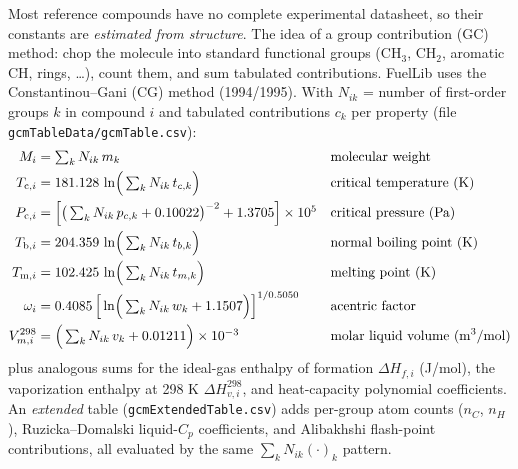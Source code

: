 \documentclass[11pt]{article}
\begin{document}
Most reference compounds have no complete experimental datasheet, so their
constants are \emph{estimated from structure}. The idea of a group
contribution (GC) method: chop the molecule into standard functional groups
($\mathrm{CH_3}$, $\mathrm{CH_2}$, aromatic CH, rings, \ldots), count them, and sum
tabulated contributions. FuelLib uses the Constantinou--Gani (CG) method
(1994/1995). With $N_{ik}$ = number of first-order groups $k$ in compound
$i$ and tabulated contributions $c_k$ per property (file
\texttt{gcmTableData/gcmTable.csv}):
\begin{align}
  M_i &= \textstyle\sum_k N_{ik}\, m_k
        && \text{molecular weight}\\
  T_{\mathrm{c},i} &= 181.128\, \ln\!\Big(\textstyle\sum_k N_{ik}\, t_{c,k}\Big)
        && \text{critical temperature (\si{K})}\\
  P_{\mathrm{c},i} &= \Big[\big(\textstyle\sum_k N_{ik}\, p_{c,k} + 0.10022\big)^{-2}
             + 1.3705\Big]\times 10^{5}
        && \text{critical pressure (\si{Pa})}\\
  T_{\mathrm{b},i} &= 204.359\, \ln\!\Big(\textstyle\sum_k N_{ik}\, t_{b,k}\Big)
        && \text{normal boiling point (\si{K})}\\
  T_{\mathrm{m},i} &= 102.425\, \ln\!\Big(\textstyle\sum_k N_{ik}\, t_{m,k}\Big)
        && \text{melting point (\si{K})}\\
  \omega_i &= 0.4085\,
     \Big[\ln\!\Big(\textstyle\sum_k N_{ik}\, w_k + 1.1507\Big)\Big]^{1/0.5050}
        && \text{acentric factor}\\
  V_{m,i}^{298} &= \Big(\textstyle\sum_k N_{ik}\, v_k + 0.01211\Big)
                   \times 10^{-3}
        && \text{molar liquid volume (\si{m^3/mol})}
\end{align}
plus analogous sums for the ideal-gas enthalpy of formation
$\Delta H_{f,i}$ (\si{J/mol}), the vaporization enthalpy at 298 K
$\Delta H_{v,i}^{298}$, and heat-capacity polynomial coefficients.
An \emph{extended} table (\texttt{gcmExtendedTable.csv}) adds per-group atom
counts ($n_{C}$, $n_{H}$), Ruzicka--Domalski liquid-$C_p$ coefficients, and
Alibakhshi flash-point contributions, all evaluated by the same
$\sum_k N_{ik}(\cdot)_k$ pattern.
\end{document}

